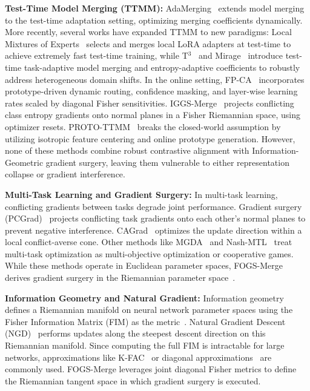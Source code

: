 \documentclass{article}
\theoremstyle{plain}
\theoremstyle{definition}
\theoremstyle{remark}
\begin{document}
\textbf{Test-Time Model Merging (TTMM):} AdaMerging~\cite{adamerging} extends model merging to the test-time adaptation setting, optimizing merging coefficients dynamically. More recently, several works have expanded TTMM to new paradigms: Local Mixtures of Experts~\cite{bertolissi2025local} selects and merges local LoRA adapters at test-time to achieve extremely fast test-time training, while T$^3$~\cite{imam2025t3} and Mirage~\cite{mirage2026mean} introduce test-time task-adaptive model merging and entropy-adaptive coefficients to robustly address heterogeneous domain shifts. In the online setting, FP-CA~\cite{fpca} incorporates prototype-driven dynamic routing, confidence masking, and layer-wise learning rates scaled by diagonal Fisher sensitivities. IGGS-Merge~\cite{iggs} projects conflicting class entropy gradients onto normal planes in a Fisher Riemannian space, using optimizer resets. PROTO-TTMM~\cite{protottmm} breaks the closed-world assumption by utilizing isotropic feature centering and online prototype generation. However, none of these methods combine robust contrastive alignment with Information-Geometric gradient surgery, leaving them vulnerable to either representation collapse or gradient interference.

\textbf{Multi-Task Learning and Gradient Surgery:} In multi-task learning, conflicting gradients between tasks degrade joint performance. Gradient surgery (PCGrad)~\cite{pcgrad} projects conflicting task gradients onto each other's normal planes to prevent negative interference. CAGrad~\cite{cagrad} optimizes the update direction within a local conflict-averse cone. Other methods like MGDA~\cite{mgda} and Nash-MTL~\cite{nash_mtl} treat multi-task optimization as multi-objective optimization or cooperative games. While these methods operate in Euclidean parameter spaces, FOGS-Merge derives gradient surgery in the Riemannian parameter space~\cite{rgrad}.

\textbf{Information Geometry and Natural Gradient:} Information geometry defines a Riemannian manifold on neural network parameter spaces using the Fisher Information Matrix (FIM) as the metric~\cite{amari98, amari_book}. Natural Gradient Descent (NGD)~\cite{pascanu} performs updates along the steepest descent direction on this Riemannian manifold. Since computing the full FIM is intractable for large networks, approximations like K-FAC~\cite{kfac, grosse_conv} or diagonal approximations~\cite{fisher_survey} are commonly used. FOGS-Merge leverages joint diagonal Fisher metrics to define the Riemannian tangent space in which gradient surgery is executed.
\end{document}

